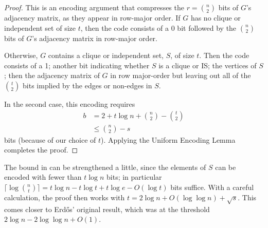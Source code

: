 \documentclass[lotsofwhite]{patmorin}
\begin{document}
\begin{proof}
This is an encoding argument that compresses the $r=\binom{n}{2}$ bits
of $G$'s adjacency matrix, as they appear in row-major order.  If $G$
has no clique or independent set of size $t$, then the code consists of
a 0 bit followed by the $\binom{n}{2}$ bits of $G$'s adjacency matrix
in row-major order.

Otherwise, $G$ contains a clique or independent set, $S$, of size $t$.
Then the code consists of a 1; another bit indicating whether $S$ is a
clique or IS; the vertices of $S$; then the adjacency matrix of $G$ in
row major-order but leaving out all of the $\binom{t}{2}$ bits implied
by the edges or non-edges in $S$.

In the second case, this encoding requires 
\begin{align*}
   b & = 2 + t\log n + \binom{n}{2}-\binom{t}{2} \\
     & \le \binom{n}{2} - s 
\end{align*}
bits (because of our choice of $t$).   Applying the Uniform Encoding
Lemma completes the proof.
\end{proof}

\begin{rem}
The bound in  can be strengthened a little, since
the elements of $S$ can be encoded with fewer than $t\log n$ bits; in
particular $\lceil\log\binom{n}{t}\rceil=t\log n - t\log t + t\log e -
O(\log t)$ bits suffice.  With a careful calculation, the proof then
works with $t=2\log n +O(\log\log n) + \sqrt{s}$. This comes closer to
Erdős' original result, which was at the threshold $2\log n - 2\log\log
n + O(1)$.
\end{rem}
\end{document}

